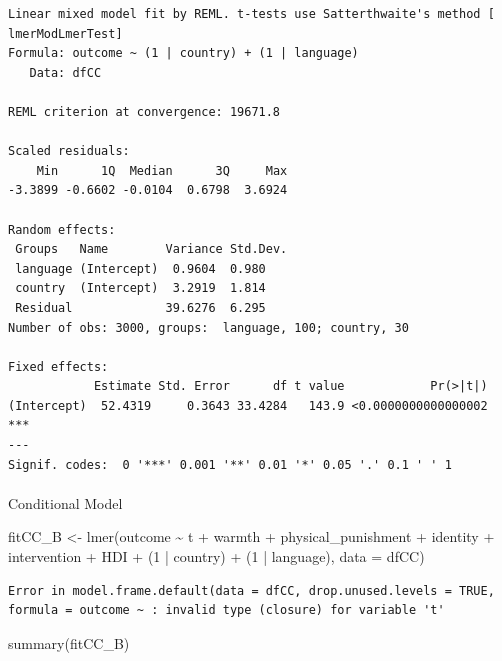 \documentclass[
  letterpaper,
  DIV=11,
  numbers=noendperiod]{scrreprt}
\makeatletter
\let\oldparagraph\paragraph
\renewcommand{\paragraph}{
    \@ifstar
      \xxxParagraphStar
      \xxxParagraphNoStar
  }
\newcommand{\xxxParagraphStar}[1]{\oldparagraph*{#1}\mbox{}}
\newcommand{\xxxParagraphNoStar}[1]{\oldparagraph{#1}\mbox{}}
\newenvironment{Shaded}{\begin{snugshade}}{\end{snugshade}}
\newcommand{\AttributeTok}[1]{\textcolor[rgb]{0.40,0.45,0.13}{#1}}
\newcommand{\DecValTok}[1]{\textcolor[rgb]{0.68,0.00,0.00}{#1}}
\newcommand{\FunctionTok}[1]{\textcolor[rgb]{0.28,0.35,0.67}{#1}}
\newcommand{\NormalTok}[1]{\textcolor[rgb]{0.00,0.23,0.31}{#1}}
\newcommand{\OtherTok}[1]{\textcolor[rgb]{0.00,0.23,0.31}{#1}}
\newcommand{\SpecialCharTok}[1]{\textcolor[rgb]{0.37,0.37,0.37}{#1}}
\makeatother
\begin{document}
\begin{verbatim}
Linear mixed model fit by REML. t-tests use Satterthwaite's method [
lmerModLmerTest]
Formula: outcome ~ (1 | country) + (1 | language)
   Data: dfCC

REML criterion at convergence: 19671.8

Scaled residuals: 
    Min      1Q  Median      3Q     Max 
-3.3899 -0.6602 -0.0104  0.6798  3.6924 

Random effects:
 Groups   Name        Variance Std.Dev.
 language (Intercept)  0.9604  0.980   
 country  (Intercept)  3.2919  1.814   
 Residual             39.6276  6.295   
Number of obs: 3000, groups:  language, 100; country, 30

Fixed effects:
            Estimate Std. Error      df t value            Pr(>|t|)    
(Intercept)  52.4319     0.3643 33.4284   143.9 <0.0000000000000002 ***
---
Signif. codes:  0 '***' 0.001 '**' 0.01 '*' 0.05 '.' 0.1 ' ' 1
\end{verbatim}

\paragraph{Conditional Model}\label{conditional-model-4}

\begin{Shaded}
\begin{Highlighting}[]
\NormalTok{fitCC\_B }\OtherTok{\textless{}{-}} \FunctionTok{lmer}\NormalTok{(outcome }\SpecialCharTok{\textasciitilde{}}\NormalTok{ t }\SpecialCharTok{+}\NormalTok{ warmth }\SpecialCharTok{+}\NormalTok{ physical\_punishment }\SpecialCharTok{+} 
\NormalTok{                identity }\SpecialCharTok{+}\NormalTok{ intervention }\SpecialCharTok{+}\NormalTok{ HDI }\SpecialCharTok{+} 
\NormalTok{                (}\DecValTok{1} \SpecialCharTok{|}\NormalTok{ country) }\SpecialCharTok{+}
\NormalTok{                (}\DecValTok{1} \SpecialCharTok{|}\NormalTok{ language),}
              \AttributeTok{data =}\NormalTok{ dfCC)}
\end{Highlighting}
\end{Shaded}

\begin{verbatim}
Error in model.frame.default(data = dfCC, drop.unused.levels = TRUE, formula = outcome ~ : invalid type (closure) for variable 't'
\end{verbatim}

\begin{Shaded}
\begin{Highlighting}[]
\FunctionTok{summary}\NormalTok{(fitCC\_B)}
\end{Highlighting}
\end{Shaded}
\end{document}
